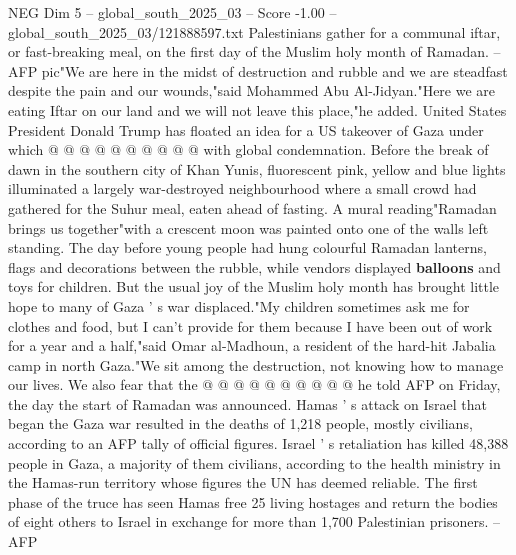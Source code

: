 \begin{textsample}{NEG Dim 5 – global\_south\_2025\_03 – Score -1.00 – global\_south\_2025\_03/121888597.txt}
Palestinians gather for a communal iftar, or fast-breaking meal, on the first day of the Muslim holy month of Ramadan. -- AFP pic"We are here in the midst of destruction and rubble and we are steadfast despite the pain and our wounds,"said Mohammed Abu Al-Jidyan."Here we are eating Iftar on our land and we will not leave this place,"he added.
United States President Donald Trump has floated an idea for a US takeover of Gaza under which @ @ @ @ @ @ @ @ @ @ with global condemnation.
Before the break of dawn in the southern city of Khan Yunis, fluorescent pink, yellow and blue lights illuminated a largely war-destroyed neighbourhood where a small crowd had gathered for the Suhur meal, eaten ahead of fasting.
A mural reading"Ramadan brings us together"with a crescent moon was painted onto one of the walls left standing.
The day before young people had hung colourful Ramadan lanterns, flags and decorations between the rubble, while vendors displayed \textbf{balloons} and toys for children.
But the usual joy of the Muslim holy month has brought little hope to many of Gaza ' s war displaced."My children sometimes ask me for clothes and food, but I can't provide for them because I have been out of work for a year and a half,"said Omar al-Madhoun, a resident of the hard-hit Jabalia camp in north Gaza."We sit among the destruction, not knowing how to manage our lives.
We also fear that the @ @ @ @ @ @ @ @ @ @ he told AFP on Friday, the day the start of Ramadan was announced.
Hamas ' s attack on Israel that began the Gaza war resulted in the deaths of 1,218 people, mostly civilians, according to an AFP tally of official figures.
Israel ' s retaliation has killed 48,388 people in Gaza, a majority of them civilians, according to the health ministry in the Hamas-run territory whose figures the UN has deemed reliable.
The first phase of the truce has seen Hamas free 25 living hostages and return the bodies of eight others to Israel in exchange for more than 1,700 Palestinian prisoners. -- AFP

\end{textsample}
